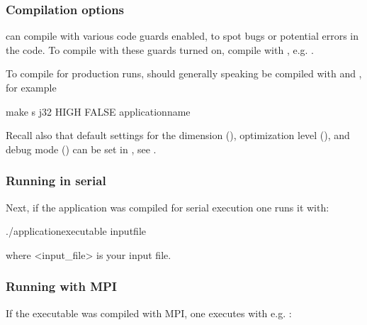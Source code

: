 \documentclass[letterpaper,10pt,english]{sphinxmanual}
\begin{document}
\subsubsection{Compilation options}
\label{\detokenize{Base/Control:compilation-options}}
 can compile with various code guards enabled, to spot bugs or potential errors in the code.
To compile with these guards turned on, compile with , e.g. .

To compile for production runs,  should generally speaking be compiled with  and , for example

\begin{sphinxVerbatim}[commandchars=\\\{\},formatcom=\scriptsize]
make \PYGZhy{}s \PYGZhy{}j32  HIGH FALSE \PYGZlt{}application\PYGZus{}name\PYGZgt{}
\end{sphinxVerbatim}

Recall also that default settings for the dimension (), optimization level (), and debug mode () can be set in , see {\hyperref[\detokenize{Base/GettingStarted:chap-gettingstarted}]{}}.


\subsubsection{Running in serial}
\label{\detokenize{Base/Control:running-in-serial}}
Next, if the application was compiled for serial execution one runs it with:

\begin{sphinxVerbatim}[commandchars=\\\{\},formatcom=\scriptsize]
./\PYGZlt{}application\PYGZus{}executable\PYGZgt{} \PYGZlt{}input\PYGZus{}file\PYGZgt{}
\end{sphinxVerbatim}

where \textless{}input\_file\textgreater{} is your input file.


\subsubsection{Running with MPI}
\label{\detokenize{Base/Control:running-with-mpi}}
If the executable was compiled with MPI, one executes with e.g. :
\end{document}
